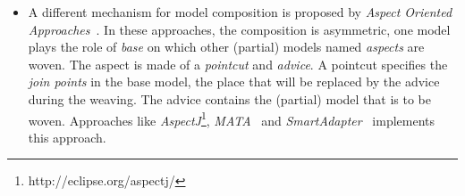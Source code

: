 \begin{itemize}
    		\item A different mechanism for model composition is proposed by \emph{Aspect Oriented Approaches}~\cite{aop}. In these approaches, the composition is asymmetric, one model plays the role of \emph{base} on which other (partial) models named \emph{aspects} are woven. The aspect is made of a \emph{pointcut} and \emph{advice}. A pointcut specifies the \emph{join points} in the base model, \ie the place that will be replaced by the advice during the weaving. The advice contains the (partial) model that is to be woven. Approaches like \emph{AspectJ}\footnote{http://eclipse.org/aspectj/}, \emph{MATA}~\cite{matabib} and \emph{SmartAdapter}~\cite{smartadapbib} implements this approach. %
    	\end{itemize}
    	
